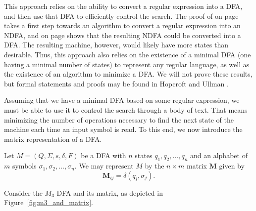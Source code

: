 \documentclass{bcthesis}
\newcommand{\footcite}[2]{\xspace\cite[pg.~{#2}]{#1}\xspace}
\begin{document}
		This approach relies on the ability to convert a regular expression into a DFA, and then use that DFA to efficiently control the search.
		The proof of  on page \pageref{prop:regular_languages_representable} takes a first step towards an algorithm to convert a regular expression into an NDFA, and  on page \pageref{prop:ndfa_dfa_equivalent} shows that the resulting NDFA could be converted into a DFA.
		The resulting machine, however, would likely have more states than desirable.
		Thus, this approach also relies on the existence of a minimal DFA (one having a minimal number of states) to represent any regular language, as well as the existence of an algorithm to minimize a DFA.
		We will not prove these results, but formal statements and proofs may be found in Hopcroft and Ullman \footcite{hopcroft}{65--71}.

		Assuming that we have a minimal DFA based on some regular expression, we must be able to use it to control the search through a body of text.
		That means minimizing the number of operations necessary to find the next state of the machine each time an input symbol is read.
		To this end, we now introduce the matrix representation of a DFA.

		\begin{definition}
			Let $M = (Q, \Sigma, s, \delta, F)$ be a DFA with $n$ states $q_1, q_2, \dots, q_n$ and an alphabet of $m$ symbols $\sigma_1, \sigma_2, \dots, \sigma_n$.
			We may represent $M$ by the $n \times m$ matrix $\mathbf{M}$ given by 
			\[
				\mathbf{M}_{ij} = \delta(q_i, \sigma_j).
			\]
		\end{definition}

		Consider the $M_3$ DFA and its matrix, as depicted in Figure~\ref{fig:m3_and_matrix}.
\end{document}
